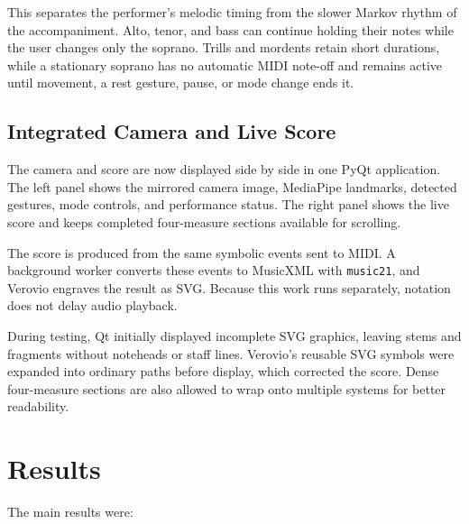 \documentclass[11pt,a4paper]{article}
\begin{document}
This separates the performer's melodic timing from the slower Markov rhythm of
the accompaniment. Alto, tenor, and bass can continue holding their notes while
the user changes only the soprano. Trills and mordents retain short durations,
while a stationary soprano has no automatic MIDI note-off and remains active
until movement, a rest gesture, pause, or mode change ends it.

\subsection{Integrated Camera and Live Score}

The camera and score are now displayed side by side in one PyQt application.
The left panel shows the mirrored camera image, MediaPipe landmarks, detected
gestures, mode controls, and performance status. The right panel shows the live
score and keeps completed four-measure sections available for scrolling.

The score is produced from the same symbolic events sent to MIDI. A background
worker converts these events to MusicXML with \texttt{music21}, and Verovio
engraves the result as SVG. Because this work runs separately, notation does
not delay audio playback.

During testing, Qt initially displayed incomplete SVG graphics, leaving stems
and fragments without noteheads or staff lines. Verovio's reusable SVG symbols
were expanded into ordinary paths before display, which corrected the score.
Dense four-measure sections are also allowed to wrap onto multiple systems for
better readability.

\section{Results}

The main results were:
\end{document}
